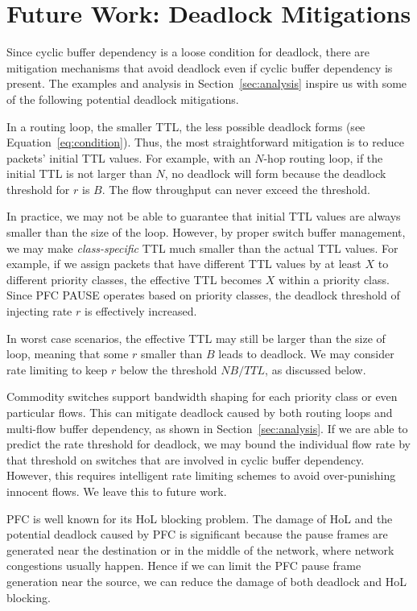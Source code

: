 \section{Future Work: Deadlock Mitigations}
\label{sec:mitigation}

Since cyclic buffer dependency is a loose condition for deadlock, there are
mitigation mechanisms that avoid deadlock even if cyclic buffer dependency is present.
The examples and analysis in Section~\ref{sec:analysis}
inspire us with some of the following potential deadlock mitigations.


 In a routing loop, 
the smaller TTL, the less possible deadlock forms (see Equation~\ref{eq:condition}).
Thus, the most straightforward mitigation is to reduce packets' initial TTL values.
For example, with an $N$-hop routing loop, if the initial TTL is not larger than $N$,
no deadlock will form because the deadlock threshold for $r$ is $B$. The flow throughput
can never exceed the threshold.

In practice, we may not be able to guarantee that initial TTL values are always smaller than
the size of the loop. However, by proper switch buffer management, we may make {\em class-specific}
TTL much smaller than the actual TTL values. For example, if we assign packets 
that have different TTL values by at least $X$ to different priority classes, the effective TTL becomes $X$
within a priority class. Since PFC PAUSE operates based on priority classes, the deadlock threshold
of injecting rate $r$ is effectively increased.

In worst case scenarios, the effective TTL may still be larger than the size of loop, meaning
that some $r$ smaller than $B$ leads to deadlock. We may consider rate limiting to keep
$r$ below the threshold $NB/TTL$, as discussed below.

 Commodity switches support bandwidth shaping for each priority class
or even particular flows. This can mitigate deadlock caused by both routing loops and multi-flow
buffer dependency, as shown in Section~\ref{sec:analysis}. If we are able to predict the rate 
threshold for deadlock, we may bound the individual flow rate by that threshold on switches 
that are involved in cyclic buffer dependency. However, this requires intelligent rate
limiting schemes to avoid over-punishing innocent flows. We leave this to future work.


PFC is well known for its HoL blocking problem. The damage of HoL and the potential deadlock caused 
by PFC is significant because the pause frames are generated near the destination or in the middle of 
the network, where network congestions usually happen. Hence if we can limit the PFC pause frame 
generation near the source, we can reduce the damage of both deadlock and HoL blocking. 


